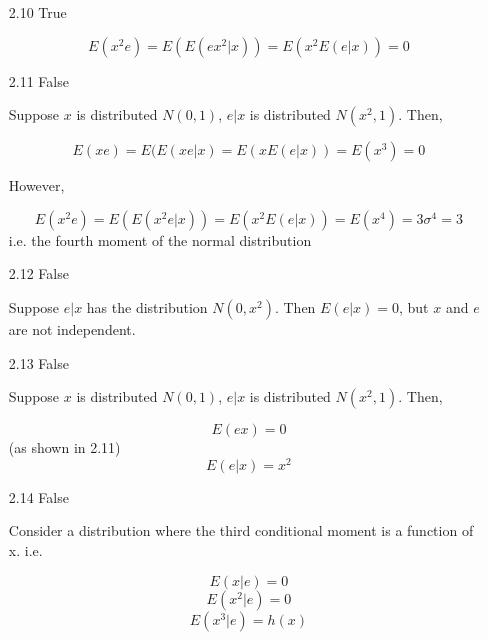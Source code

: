 \documentclass{article}
\begin{document}
\begin{enumerate}
    \item[2.10] True

    $$E(x^2e) = E(E(e x^2 |x) ) = E( x^2 E(e |x) ) = 0$$

    \item[2.11] False

    Suppose $x$ is distributed $N(0,1)$, $e|x$ is distributed $N(x^2,1)$. Then,

    $$E(xe) = E(E(xe|x) = E(xE(e|x)) = E(x^3) = 0$$

    However,

    $$E(x^2e) = E(E(x^2e|x)) = E(x^2E(e|x)) = E(x^4) = 3\sigma ^{4} = 3 $$ i.e. the fourth moment of the normal distribution

    \item[2.12] False

    Suppose $e|x$ has the distribution $N(0,x^2)$. Then $E(e|x) = 0$, but $x$ and $e$ are not independent.

   
    \item[2.13] False

    Suppose $x$ is distributed $N(0,1)$, $e|x$ is distributed $N(x^2,1)$. Then,

    $$E(ex) = 0$$ (as shown in 2.11)
    $$E(e|x) = x^2$$


    \item[2.14] False

    Consider a distribution where the third conditional moment is a function of x. i.e. 

    $$E(x|e) = 0$$
    $$E(x^2|e) = 0$$
    $$E(x^3|e) = h(x)$$

\end{enumerate}
\end{document}
